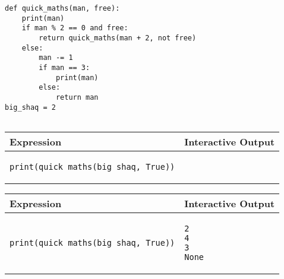 \begin{blocksection}
\question

\begin{lstlisting}
def quick_maths(man, free):    
    print(man)
    if man % 2 == 0 and free:
        return quick_maths(man + 2, not free)
    else:
        man -= 1
        if man == 3:
            print(man)
        else:
            return man
big_shaq = 2
    
\end{lstlisting}

\begin{center}
\begin{tabular}{|p{10cm}|p{5cm}|} 
\hline
\textbf{Expression} & \textbf{Interactive Output} \\ 
\hline
\rule{0pt}{3ex}
\begin{lstlisting}
print(quick_maths(big_shaq, True))
\end{lstlisting}
&  \\ 
\hline
\end{tabular}
\end{center}


\begin{solution}[1.5in]
\begin{center}
\begin{tabular}{|p{8cm}|p{6cm}|} 
\hline
\textbf{Expression} & \textbf{Interactive Output} \\ 
\hline
\rule{0pt}{4ex}
\begin{lstlisting}
print(quick_maths(big_shaq, True))
\end{lstlisting}
&  
\begin{lstlisting}
2
4
3
None
\end{lstlisting}\\ 
\hline
\end{tabular}
\end{center}

\end{solution}
\end{blocksection}
